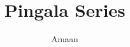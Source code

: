 \documentclass[journal,12pt,twocolumn]{IEEEtran}
\begin{document}
	\makeatletter
	\makeatother
	\let\StandardTheFigure\thefigure
	\renewcommand{\thefigure}{\theproblem}
	\def\putbox#1#2#3{\makebox[0in][l]{\makebox[#1][l]{}\raisebox{\baselineskip}[0in][0in]{\raisebox{#2}[0in][0in]{#3}}}}
	\def\rightbox#1{\makebox[0in][r]{#1}}
	\def\centbox#1{\makebox[0in]{#1}}
	\def\topbox#1{\raisebox{-\baselineskip}[0in][0in]{#1}}
	\def\midbox#1{\raisebox{-0.5\baselineskip}[0in][0in]{#1}}
	\vspace{3cm}
	\title{ 
		Pingala Series
	}
	\author{ Amaan %
}
% 
%
\end{document}
